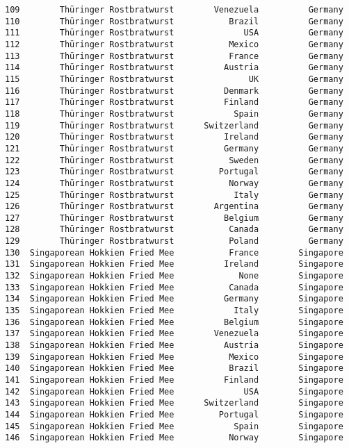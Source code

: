 \documentclass[11pt]{article}
\begin{document}
\begin{tcolorbox}[breakable, size=fbox, boxrule=.5pt, pad at break*=1mm, opacityfill=0]
\begin{Verbatim}[commandchars=\\\{\}]
109        Thüringer Rostbratwurst        Venezuela          Germany
110        Thüringer Rostbratwurst           Brazil          Germany
111        Thüringer Rostbratwurst              USA          Germany
112        Thüringer Rostbratwurst           Mexico          Germany
113        Thüringer Rostbratwurst           France          Germany
114        Thüringer Rostbratwurst          Austria          Germany
115        Thüringer Rostbratwurst               UK          Germany
116        Thüringer Rostbratwurst          Denmark          Germany
117        Thüringer Rostbratwurst          Finland          Germany
118        Thüringer Rostbratwurst            Spain          Germany
119        Thüringer Rostbratwurst      Switzerland          Germany
120        Thüringer Rostbratwurst          Ireland          Germany
121        Thüringer Rostbratwurst          Germany          Germany
122        Thüringer Rostbratwurst           Sweden          Germany
123        Thüringer Rostbratwurst         Portugal          Germany
124        Thüringer Rostbratwurst           Norway          Germany
125        Thüringer Rostbratwurst            Italy          Germany
126        Thüringer Rostbratwurst        Argentina          Germany
127        Thüringer Rostbratwurst          Belgium          Germany
128        Thüringer Rostbratwurst           Canada          Germany
129        Thüringer Rostbratwurst           Poland          Germany
130  Singaporean Hokkien Fried Mee           France        Singapore
131  Singaporean Hokkien Fried Mee          Ireland        Singapore
132  Singaporean Hokkien Fried Mee             None        Singapore
133  Singaporean Hokkien Fried Mee           Canada        Singapore
134  Singaporean Hokkien Fried Mee          Germany        Singapore
135  Singaporean Hokkien Fried Mee            Italy        Singapore
136  Singaporean Hokkien Fried Mee          Belgium        Singapore
137  Singaporean Hokkien Fried Mee        Venezuela        Singapore
138  Singaporean Hokkien Fried Mee          Austria        Singapore
139  Singaporean Hokkien Fried Mee           Mexico        Singapore
140  Singaporean Hokkien Fried Mee           Brazil        Singapore
141  Singaporean Hokkien Fried Mee          Finland        Singapore
142  Singaporean Hokkien Fried Mee              USA        Singapore
143  Singaporean Hokkien Fried Mee      Switzerland        Singapore
144  Singaporean Hokkien Fried Mee         Portugal        Singapore
145  Singaporean Hokkien Fried Mee            Spain        Singapore
146  Singaporean Hokkien Fried Mee           Norway        Singapore

\end{Verbatim}
\end{tcolorbox}
\end{document}
